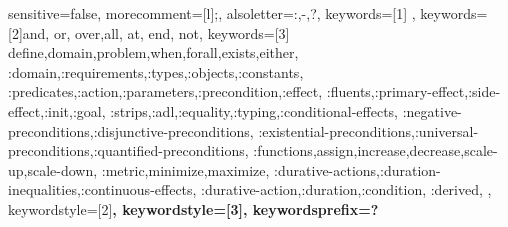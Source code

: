 {
  sensitive=false,    %
  morecomment=[l]{;}, %
  alsoletter={:,-,?},   %
  keywords=[1]{ },
  keywords=[2]{and, or, over,all, at, end, not},
  keywords=[3]{
      define,domain,problem,when,forall,exists,either,
      :domain,:requirements,:types,:objects,:constants,
      :predicates,:action,:parameters,:precondition,:effect,
      :fluents,:primary-effect,:side-effect,:init,:goal,
      :strips,:adl,:equality,:typing,:conditional-effects,
      :negative-preconditions,:disjunctive-preconditions,
      :existential-preconditions,:universal-preconditions,:quantified-preconditions,
      :functions,assign,increase,decrease,scale-up,scale-down,
      :metric,minimize,maximize,
      :durative-actions,:duration-inequalities,:continuous-effects,
      :durative-action,:duration,:condition,
      :derived,
  },
  keywordstyle=[2]\color{\blueColor}\bfseries,
  keywordstyle=[3]\color{\greenColor}\bfseries,
  keywordsprefix=?
}

\usepackage[table]{xcolor}

